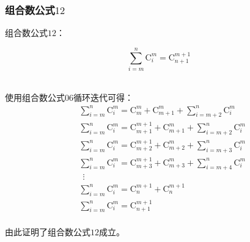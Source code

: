 \documentclass[UTF8]{ctexart}
\newcommand{\Co}{\mathrm{C}}
\begin{document}
\newpage

\subsubsection{组合数公式$12$}
    组合数公式$12$：
    \begin{large}
        \begin{equation*}
            \sum_{i=m}^n\Co_i^m=\Co_{n+1}^{m+1}
        \end{equation*}
    \end{large}\\
    使用组合数公式$06$循环迭代可得：\vspace{7pt}
    \setcounter{equation}{0}
    \begin{align}
        &\sum_{i=m}^n\Co_i^m=\Co_m^m+\Co_{m+1}^{m}+\sum_{i=m+2}^n\Co_i^m\\[3mm]
        &\sum_{i=m}^n\Co_i^m=\Co_{m+1}^{m+1}+\Co_{m+1}^{m}+\sum_{i=m+2}^n\Co_i^m\\[3mm]
        &\sum_{i=m}^n\Co_i^m=\Co_{m+2}^{m+1}+\Co_{m+2}^{m}+\sum_{i=m+3}^n\Co_i^m\\[3mm]
        &\sum_{i=m}^n\Co_i^m=\Co_{m+3}^{m+1}+\Co_{m+3}^{m}+\sum_{i=m+4}^n\Co_i^m\\[3mm]
        &~~\vdots\\[5mm]
        &\sum_{i=m}^n\Co_i^m=\Co_n^{m+1}+\Co_n^{m+1}\\[5mm]
        &\sum_{i=m}^n\Co_i^m=\Co_{n+1}^{m+1}
    \end{align}\\
    由此证明了组合数公式$12$成立。

\newpage
\end{document}
